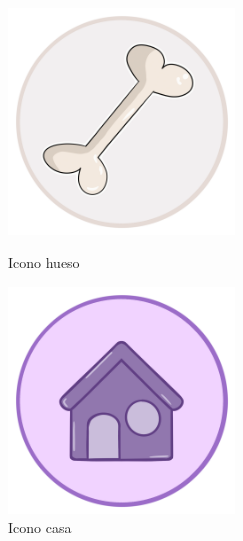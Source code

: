 \documentclass[a4paper, 12pt]{article}
\begin{document}
\begin{figure}[H]
   	\begin{minipage}{0.48\textwidth}
		\begin{center}
			{\includegraphics[width=6cm]{logo/Protectora.png}\par}
			\caption{Icono hueso}
		\end{center}  
	\end{minipage}\hfill
   	\begin{minipage}{0.48\textwidth}
		\begin{center}
			{\includegraphics[width=6cm]{logo/Casa.png}\par}
			\caption{Icono casa}
		\end{center}  
	\end{minipage}\hfill
\end{figure}
\end{document}
